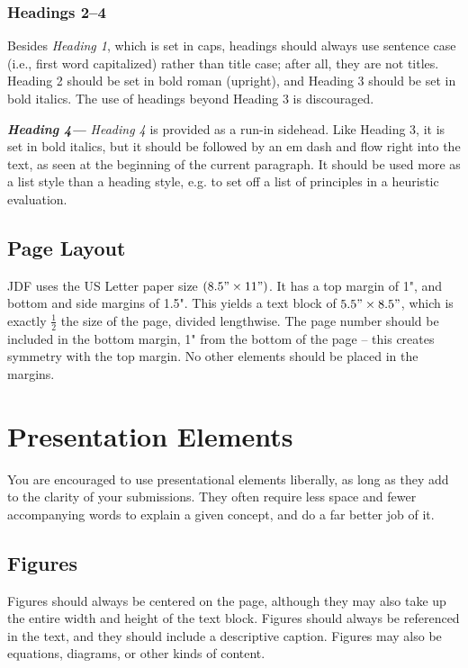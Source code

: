 \documentclass[11pt,a4paper,usenames,dvipsnames]{article}
\begin{document}
\subsubsection{Headings 2–4}
Besides \textit{Heading 1}, which is set in caps, headings should always use sentence case (i.e., first word capitalized) rather than title case; after all, they are not titles. Heading 2 should be set in bold roman (upright), and Heading 3 should be set in bold italics. The use of headings beyond Heading 3 is discouraged.

\textbf{\textit{Heading 4—}} \textit{Heading 4} is provided as a run-in sidehead. Like Heading 3, it is set in bold italics, but it should be followed by an em dash and flow right into the text, as seen at the beginning of the current paragraph. It should be used more as a list style than a heading style, e.g. to set off a list of principles in a heuristic evaluation.

\subsection{Page Layout}
JDF uses the US Letter paper size $(8.5" \times 11")$. It has a top margin of 1", and bottom and side margins of 1.5". This yields a text block of $5.5" \times 8.5"$, which is exactly $\frac{1}{2}$ the size of the page, divided lengthwise.
The page number should be included in the bottom margin, 1" from the bottom of the page – this creates symmetry with the top margin. No other elements should be placed in the margins.

\section{Presentation Elements}
You are encouraged to use presentational elements liberally, as long as they add to the clarity of your submissions. They often require less space and fewer accompanying words to explain a given concept, and do a far better job of it.

\subsection{Figures}
Figures should always be centered on the page, although they may also take up the entire width and height of the text block. Figures should always be referenced in the text, and they should include a descriptive caption. Figures may also be equations, diagrams, or other kinds of content.
\end{document}
